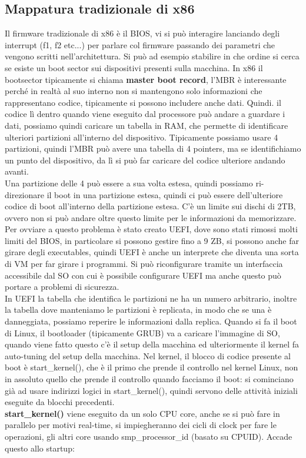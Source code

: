 \documentclass[12pt, oneside]{extbook}
\begin{document}
\subsection{Mappatura tradizionale di x86}
Il firmware tradizionale di x86 è il BIOS, vi si può interagire lanciando degli interrupt (f1, f2 etc...) per parlare col firmware passando dei parametri che vengono scritti nell'architettura. Si può ad esempio stabilire in che ordine si cerca se esiste un boot sector sui dispositivi presenti sulla macchina. In x86 il bootsector tipicamente si chiama \textbf{master boot record}, l'MBR è interessante perché in realtà al suo interno non si mantengono solo informazioni che rappresentano codice, tipicamente si possono includere anche dati. Quindi. il codice lì dentro quando viene eseguito dal processore può andare a guardare i dati, possiamo quindi caricare un tabella in RAM, che permette di identificare ulteriori partizioni all'interno del dispositivo. Tipicamente possiamo usare 4 partizioni, quindi l'MBR può avere una tabella di 4 pointers, ma se identifichiamo un punto del dispositivo, da lì si può far caricare del codice ulteriore andando avanti.\\ Una partizione delle 4 può essere a sua volta estesa, quindi possiamo ri-direzionare il boot in una partizione estesa, quindi ci può essere dell'ulteriore codice di boot all'interno della partizione estesa. C'è un limite sui dischi di 2TB, ovvero non si può andare oltre questo limite per le informazioni da memorizzare. Per ovviare a questo problema è stato creato UEFI, dove sono stati rimossi molti limiti del BIOS, in particolare si possono gestire fino a 9 ZB, si possono anche far girare degli executables, quindi UEFI è anche un interprete che diventa una sorta di VM per far girare i programmi. Si può riconfigurare tramite un interfaccia accessibile dal SO con cui è possibile configurare UEFI ma anche questo può portare a problemi di sicurezza.\\ In UEFI la tabella che identifica le partizioni ne ha un numero arbitrario, inoltre la tabella dove manteniamo le partizioni è replicata, in modo che se una è danneggiata, possiamo reperire le informazioni dalla replica. Quando si fa il boot di Linux, il bootloader (tipicamente GRUB) va a caricare l'immagine di SO, quando viene fatto questo c'è il setup della macchina ed ulteriormente il kernel fa auto-tuning del setup della macchina. Nel kernel, il blocco di codice presente al boot è start\_kernel(), che è il primo che prende il controllo nel kernel Linux, non in assoluto quello che prende il controllo quando facciamo il boot: si cominciano già ad usare indirizzi logici in start\_kernel(), quindi servono delle attività iniziali eseguite da blocchi precedenti.\\ \textbf{start\_kernel()} viene eseguito da un solo CPU core, anche se si può fare in parallelo per motivi real-time, si impiegheranno dei cicli di clock per fare le operazioni, gli altri core usando smp\_processor\_id (basato su CPUID). Accade questo allo startup:
\end{document}
